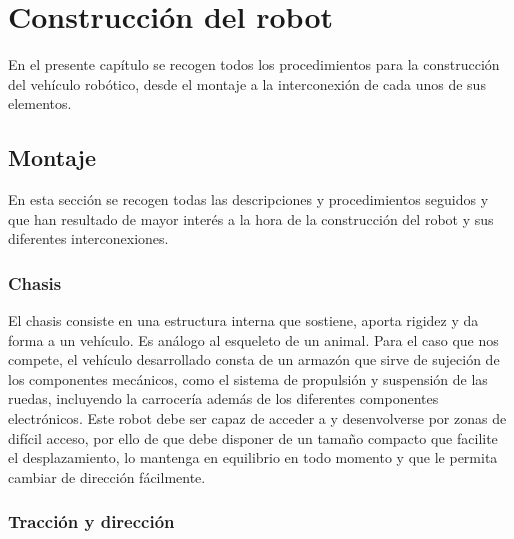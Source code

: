 

\newpage

\chapter{Construcción del robot}
\label{chap:montaje}


En el presente capítulo se recogen todos los procedimientos para la construcción del vehículo robótico, desde el montaje a la interconexión de cada unos de sus elementos.\\

\section{Montaje}

En esta sección se recogen todas las descripciones y procedimientos seguidos y que han resultado de mayor interés a la hora de la construcción del robot y 
sus diferentes interconexiones.\\

\subsection{Chasis}

El chasis consiste en una estructura interna que sostiene, aporta rigidez y da forma a un vehículo. Es análogo al esqueleto de un animal.
Para el caso que nos compete, el vehículo desarrollado consta de un armazón​ que sirve de sujeción de los componentes mecánicos, como el sistema de propulsión y suspensión de las
ruedas, incluyendo la carrocería además de los diferentes componentes electrónicos.​ Este robot debe ser capaz de acceder a y desenvolverse por zonas de difícil acceso, por ello de
que debe disponer de un tamaño compacto que facilite el desplazamiento, lo mantenga en equilibrio en todo momento y que le permita cambiar de dirección fácilmente.\\

\subsection{Tracción y dirección}

